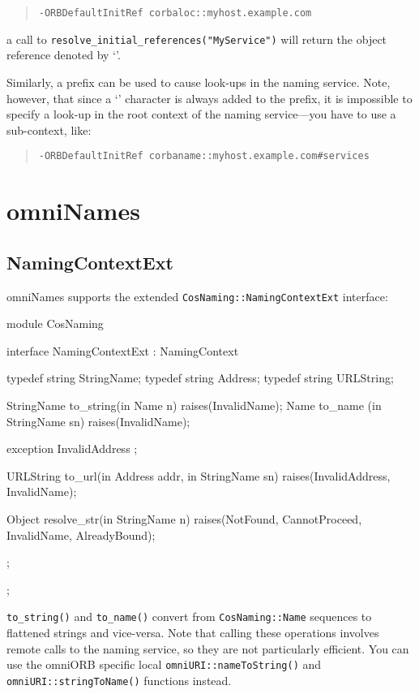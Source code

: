 \documentclass[11pt,oneside,a4paper]{book}
\newcommand{\type}[1]{\texttt{#1}}
\newcommand{\intf}[1]{\texttt{#1}}
\newcommand{\code}[1]{\texttt{#1}}
\newcommand{\op}[1]{\texttt{#1()}}
\newcommand{\cmdline}[1]{\texttt{#1}}
\newcommand{\dsc}{\discretionary{}{}{}}
\begin{document}
\begin{quote}
\cmdline{-ORBDefaultInitRef corbaloc::myhost.example.com}
\end{quote}

\noindent a call to \code{resolve\_initial\_references("MyService")}
will return the object reference denoted by
`'.

Similarly, a  prefix can be used to cause
look-ups in the naming service. Note, however, that since a
`\corbauri{/}' character is always added to the prefix, it is
impossible to specify a look-up in the root context of the naming
service---you have to use a sub-context, like:

\begin{quote}
\cmdline{-ORBDefaultInitRef corbaname::myhost.example.com\#services}
\end{quote}



\section{omniNames}

\subsection{NamingContextExt}

omniNames supports the extended \intf{CosNaming::NamingContextExt}
interface:

\begin{idllisting}
module CosNaming {
  interface NamingContextExt : NamingContext {
    typedef string StringName;
    typedef string Address;
    typedef string URLString;

    StringName  to_string(in Name n)        raises(InvalidName);
    Name        to_name  (in StringName sn) raises(InvalidName);

    exception InvalidAddress {};

    URLString   to_url(in Address addr, in StringName sn)
      raises(InvalidAddress, InvalidName);

    Object      resolve_str(in StringName n)
      raises(NotFound, CannotProceed, InvalidName, AlreadyBound);
  };
};
\end{idllisting}

\op{to\_string} and \op{to\_name} convert from \type{CosNaming::Name}
sequences to flattened strings and vice-versa.  Note that calling
these operations involves remote calls to the naming service, so they
are not particularly efficient. You can use the omniORB specific local
\op{omniURI::nameToString} and \op{omniURI::\dsc{}stringToName}
functions instead.
\end{document}
